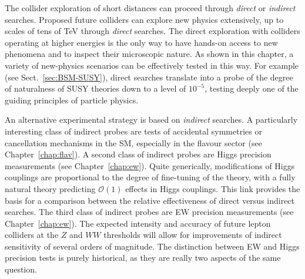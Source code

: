 \documentclass[../report.tex]{subfiles}
\begin{document}
The collider exploration of short distances can proceed through {\it direct} or {\it indirect} searches. Proposed future colliders can explore new physics extensively, up to scales of tens of TeV through {\it direct} searches. The direct exploration with colliders operating at higher energies is the only way to have hands-on access to new phenomena and to inspect their microscopic nature. As shown in this chapter, a variety of new-physics scenarios can be effectively tested in this way. For example (see Sect.~\ref{sec:BSM-SUSY}), direct searches translate into a probe of the degree of naturalness of SUSY theories down to a level of $10^{-5}$, testing deeply one of the guiding principles of particle physics. %

An alternative experimental strategy is based on {\it indirect} searches. A particularly interesting class of indirect probes are tests of accidental symmetries or cancellation mechanisms in the SM, especially in the flavour sector (see Chapter~\ref{chap:flav}).
A second class of indirect probes are Higgs precision measurements (see Chapter~\ref{chap:ew}). Quite generically, modifications of Higgs couplings are proportional to the degree of fine-tuning of the theory, with a fully natural theory predicting ${\mathcal O}(1)$ effects in Higgs couplings. This link provides the basis for a comparison between the relative effectiveness of direct versus indirect searches. The third class of indirect probes are EW precision measurements (see Chapter~\ref{chap:ew}). The expected intensity and accuracy of future lepton colliders at the $Z$ and $WW$ thresholds will allow for improvements of indirect sensitivity of several orders of magnitude. The distinction between EW and Higgs precision tests is purely historical, as they are really two aspects of the same question. 
\end{document}
